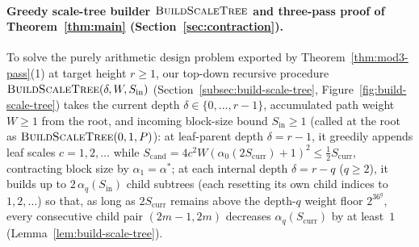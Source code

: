 \documentclass[11pt]{article}
\theoremstyle{definition}
\theoremstyle{remark}
\newcommand{\BuildScaleTree}{\textnormal{\scshape BuildScaleTree}}
\begin{document}
\paragraph{Greedy scale-tree builder $\BuildScaleTree$ and three-pass proof of Theorem~\ref{thm:main} (Section~\ref{sec:contraction}).}
To solve the purely arithmetic design problem exported by Theorem~\ref{thm:mod3-pass}(1) at target height $r \ge 1$, our top-down recursive procedure $\BuildScaleTree(\delta, W, S_{\mathrm{in}})$ (Section~\ref{subsec:build-scale-tree}, Figure~\ref{fig:build-scale-tree}) takes the current depth $\delta \in \{0, \dots, r - 1\}$, accumulated path weight $W \ge 1$ from the root, and incoming block-size bound $S_{\mathrm{in}} \ge 1$ (called at the root as $\BuildScaleTree(0, 1, P)$): at leaf-parent depth $\delta = r - 1$, it greedily appends leaf scales $c = 1, 2, \dots$ while $S_{\mathrm{cand}} = 4 c^2 W (\alpha_0(2 S_{\mathrm{curr}}) + 1)^2 \le \frac{1}{2} S_{\mathrm{curr}}$, contracting block size by $\alpha_1 = \alpha^*$; at each internal depth $\delta = r - q$ ($q \ge 2$), it builds up to $2\,\alpha_q(S_{\mathrm{in}})$ child subtrees (each resetting its own child indices to $1, 2, \dots$) so that, as long as $2 S_{\mathrm{curr}}$ remains above the depth-$q$ weight floor $2^{36^q}$, every consecutive child pair $(2m - 1, 2m)$ decreases $\alpha_q(S_{\mathrm{curr}})$ by at least~$1$ (Lemma~\ref{lem:build-scale-tree}).
\end{document}
